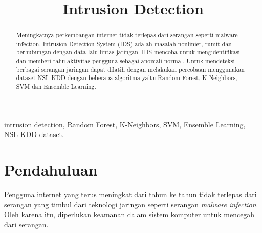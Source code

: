 \documentclass[conference]{IEEEtran}
\begin{document}
    
\title{Intrusion Detection}

\author{
\and
{}
\and
{}
}

\maketitle

\begin{abstract}
Meningkatnya perkembangan internet tidak terlepas dari serangan seperti malware infection. Intrusion Detection System (IDS) adalah masalah nonlinier, rumit dan berhubungan dengan data lalu lintas jaringan. IDS mencoba untuk mengidentifikasi dan memberi tahu aktivitas pengguna sebagai anomali normal. Untuk mendeteksi berbagai serangan jaringan dapat dilatih dengan melakukan percobaan menggunakan dataset NSL-KDD dengan beberapa algoritma yaitu Random Forest, K-Neighbors, SVM dan Ensemble Learning.
\end{abstract}

\begin{IEEEkeywords}
intrusion detection, Random Forest, K-Neighbors, SVM, Ensemble Learning, NSL-KDD dataset.
\end{IEEEkeywords}

\section{Pendahuluan}
Pengguna internet yang terus meningkat dari tahun ke tahun tidak terlepas dari serangan yang timbul dari teknologi jaringan seperti serangan \emph{malware infection}. Oleh karena itu, diperlukan keamanan dalam sistem komputer untuk mencegah dari serangan.
\end{document}

